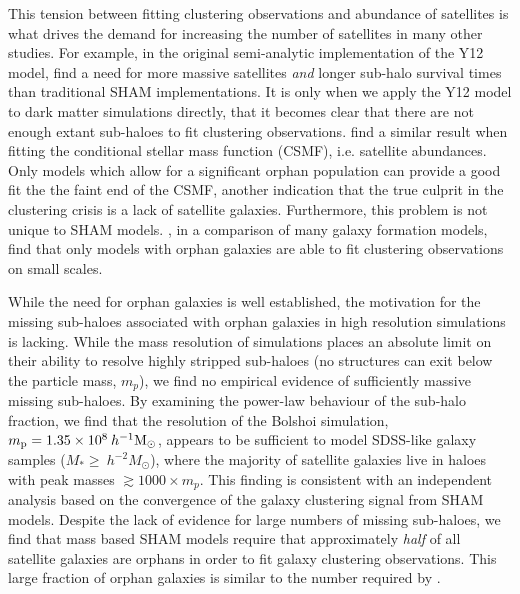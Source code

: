 \documentclass[a4paper,fleqn,usenatbib]{mnras}
\begin{document}
This tension between fitting clustering observations and abundance of satellites is what drives the demand for increasing the number of satellites in many other studies.  For example, in the original semi-analytic implementation of the Y12 model, \cite{Yang:2012ew} find a need for more massive satellites {\em and} longer sub-halo survival times than traditional SHAM implementations.  It is only when we apply the Y12 model to dark matter simulations directly, that it becomes clear that there are not enough extant sub-haloes to fit clustering observations.  \citet{Lim:2016ul} find a similar result when fitting the conditional stellar mass function (CSMF), i.e. satellite abundances.  Only models which allow for a significant orphan population can provide a good fit the the faint end of the CSMF, another indication that the true culprit in the clustering crisis is a lack of satellite galaxies.  Furthermore, this problem is not unique to SHAM models.  \cite{Pujol:2017ua}, in a comparison of many galaxy formation models, find that only models with orphan galaxies are able to fit clustering observations on small scales. 

While the need for orphan galaxies is well established, the motivation for the missing sub-haloes associated with orphan galaxies in high resolution simulations is lacking.  While the mass resolution of simulations places an absolute limit on their ability to resolve highly stripped sub-haloes (no structures can exit below the particle mass, $m_p$), we find no empirical evidence of sufficiently massive missing sub-haloes.  By examining the power-law behaviour of the sub-halo fraction, we find that the resolution of the Bolshoi simulation, $m_{\rm p} = 1.35 \times 10^8 \>h^{-1}\rm M_\odot$, appears to be sufficient to model SDSS-like galaxy samples ($M_* \geq ~h^{-2}M_{\odot}$), where the majority of satellite galaxies live in haloes with peak masses $\gtrsim 1000 \times m_p$.  This finding is consistent with an independent analysis based on the convergence of the galaxy clustering signal \citep{Guo:2013fm} from SHAM models.  Despite the lack of evidence for large numbers of missing sub-haloes, we find that mass based SHAM models require that approximately {\em half} of all satellite galaxies are orphans in order to fit galaxy clustering observations.  This large fraction of orphan galaxies is similar to the number required by \cite{Yang:2012ew}.      
\end{document}
